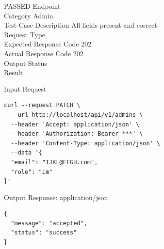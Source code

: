 \begin{testcase}{32}{PASSED}
Endpoint \hfill {}\\
Category \hfill Admin\\
Test Case Description \hfill All fields present and correct\\

Request Type    \hfill {}\\
Expected Response Code    \hfill 202\\
Actual Response Code    \hfill 202\\

Output Status \hfill {}\\
Result \hfill {}

\begin{ipblock}{Input Request}
\begin{verbatim}
curl --request PATCH \
  --url http://localhost/api/v1/admins \
  --header 'Accept: application/json' \
  --header 'Authorization: Bearer ***' \
  --header 'Content-Type: application/json' \
  --data '{
  "email": "IJKL@EFGH.com",
  "role": "im"
}'
\end{verbatim}
\end{ipblock}

\begin{opblock}{Output Response: application/json}
\begin{verbatim}
{
  "message": "accepted",
  "status": "success"
}
\end{verbatim}
\end{opblock}
\end{testcase}

